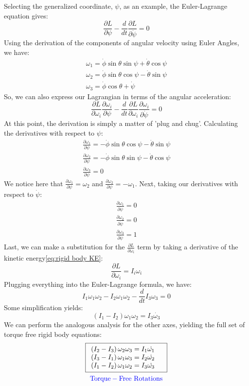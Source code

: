 \documentclass[12pt]{report}
\begin{document}
Selecting the generalized coordinate, $\psi$, as an example, the Euler-Lagrange equation gives:
$$\frac{\partial L}{\partial \psi}-\frac{d}{dt}\frac{\partial L}{\partial \dot{\psi}}=0$$
Using the derivation of the components of angular velocity using Euler Angles, we have:
\begin{gather}
\omega_1=\dot{\phi}\sin\theta\sin\psi+\dot{\theta}\cos\psi\\
    \omega_2=\dot{\phi}\sin\theta\cos\psi-\dot{\theta}\sin\psi\\
    \omega_3=\dot{\phi}\cos\theta+\dot{\psi}
\end{gather}
So, we can also express our \gls{Lagrangian} in terms of the angular acceleration:
$$\frac{\partial L}{\partial \omega_i}\frac{\partial \omega_i}{\partial \psi}-\frac{d}{dt}\frac{\partial L}{\partial \omega_i}\frac{\partial \omega_i}{\partial \dot{\psi}}=0$$
At this point, the derivation is simply a matter of 'plug and chug'. Calculating the derivatives with respect to $\psi$:
\begin{gather}
    \frac{\partial \omega_1}{\partial \psi}=-\dot{\phi}\sin\theta\cos\psi-\dot{\theta}\sin\psi\\
    \frac{\partial \omega_2}{\partial \psi}=-\dot{\phi}\sin\theta\sin\psi-\dot{\theta}\cos\psi\\
    \frac{\partial \omega_3}{\partial \psi}=0
\end{gather}
We notice here that $\frac{\partial \omega_1}{\partial \psi}=\omega_2$ and $\frac{\partial \omega_2}{\partial \psi}=-\omega_1$. Next, taking our derivatives with respect to $\dot{\psi}$:
\begin{gather}
    \frac{\partial \omega_1}{\partial \dot{\psi}}=0\\
    \frac{\partial \omega_2}{\partial \dot{\psi}}=0\\
    \frac{\partial \omega_3}{\partial \dot{\psi}}=1
\end{gather}
Last, we can make a substitution for the $\frac{\partial L}{\partial \omega_i}$ term by taking a derivative of the kinetic energy\eqref{eq:rigid body KE}:
$$\frac{\partial L}{\partial \omega_i}=I_i\omega_i$$
Plugging everything into the Euler-Lagrange formula, we have:
$$I_1\omega_1\omega_2-I_2\omega_1\omega_2-\frac{d}{dt}I_3\omega_3=0$$
Some simplification yields:
$$\left(I_1-I_2\right)\omega_1\omega_2=I_3\dot{\omega_3}$$
We can perform the analogous analysis for the other axes, yielding the full set of torque free rigid body equations:
\begin{gather}
\boxed{
\begin{array}{ll}
\left(I_2-I_3\right)\omega_2\omega_3=I_1\dot{\omega_1}
     &\\\left(I_3-I_1\right)\omega_1\omega_3=I_2\dot{\omega_2}
     &\\\left(I_1-I_2\right)\omega_1\omega_2=I_3\dot{\omega_3}
\end{array}}\\
\color{blue}
\mathrm{Torque-Free \ Rotations}
\end{gather}
\end{document}
